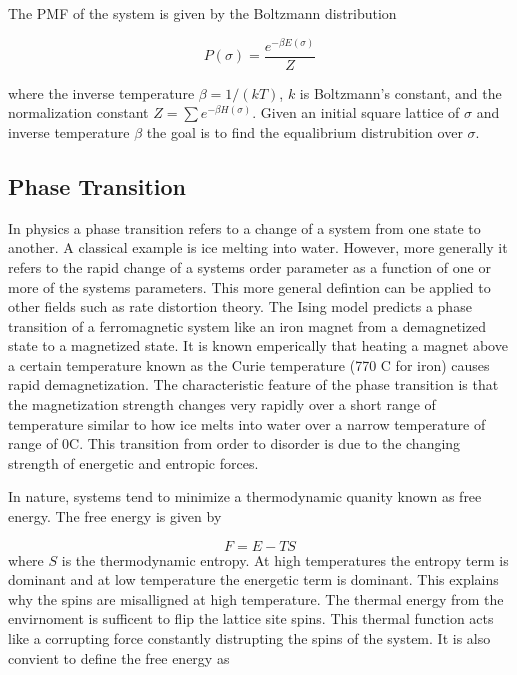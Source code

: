 \documentclass{article}
\begin{document}
The PMF of the system is given by the Boltzmann distribution

\begin{equation}
    P(\sigma) = \frac{e^{-\beta E(\sigma)}}{Z}
\end{equation}

where the inverse temperature $\beta = 1/(kT)$, $k$ is Boltzmann's constant, and the normalization constant $Z = \sum e^{-\beta H(\sigma)}$.
Given an initial square lattice of $\sigma$ and inverse temperature $\beta$ the goal is to find the equalibrium distrubition over $\sigma$.


\subsection{Phase Transition}
In physics a phase transition refers to a change of a system from one state to another. A classical example is ice melting into water.
However, more generally it refers to the rapid change of a systems order parameter as a function of one or more of the systems parameters. 
This more general defintion can be applied to other fields such as rate distortion theory. The Ising model predicts a phase transition of a ferromagnetic system like an iron magnet from a demagnetized state to a magnetized state. 
It is known emperically that heating a magnet above a certain temperature known as the Curie temperature (770 \degree C for iron) causes rapid
demagnetization. The characteristic feature of the phase transition is that the magnetization strength changes very rapidly over a short range of temperature
similar to how ice melts into water over a narrow temperature of range of 0\degree C. This transition from order to disorder is due to the changing strength of
energetic and entropic forces.

In nature, systems tend to minimize a thermodynamic quanity known as free energy. The free energy is given by

\begin{equation}\label{eq:eq1}
    F = E - TS
\end{equation}
where $S$ is the thermodynamic entropy. At high temperatures the entropy term is dominant and at low temperature the energetic term is dominant.
This explains why the spins are misalligned at high temperature. The thermal energy from the envirnoment is sufficent to flip the lattice site spins.
This thermal function acts like a corrupting force constantly distrupting the spins of the system. It is also convient to define the free energy as
\end{document}
